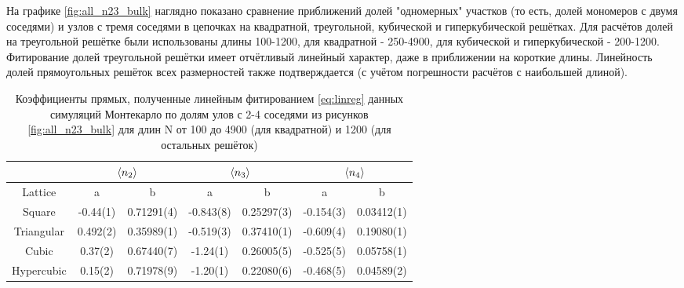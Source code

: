 На графике \ref{fig:all_n23_bulk} наглядно показано сравнение приближений долей "одномерных" участков (то есть, долей мономеров с двумя соседями) и узлов с тремя соседями в цепочках на квадратной, треугольной, кубической и гиперкубической решётках. Для расчётов долей на треугольной решётке были использованы длины 100-1200, для квадратной - 250-4900, для кубической и гиперкубической - 200-1200. Фитирование долей треугольной решётки имеет отчётливый линейный характер, даже в приближении на короткие длины. Линейность долей прямоугольных решёток всех размерностей также подтверждается (с учётом погрешности расчётов с наибольшей длиной). 

\begin{table}[h]
    \centering
    \begin{tabular}{|c|c|c|c|c|c|c|} \hline
         & \multicolumn{2}{|c|}{$\langle n_{2} \rangle$} & \multicolumn{2}{|c|}{$\langle n_{3} \rangle$} & \multicolumn{2}{|c|}{$\langle n_{4} \rangle$}\\ \hline
         Lattice & a & b & a & b  & a & b  \\ \hline
        Square & -0.44(1) & 0.71291(4) & -0.843(8) & 0.25297(3) &  -0.154(3) & 0.03412(1)  \\ \hline
        Triangular & 0.492(2) & 0.35989(1) & -0.519(3) & 0.37410(1) & -0.609(4) & 0.19080(1)  \\ \hline
        Cubic & 0.37(2) & 0.67440(7) &  -1.24(1) & 0.26005(5) & -0.525(5) & 0.05758(1) \\ \hline
        Hypercubic & 0.15(2) & 0.71978(9) & -1.20(1) & 0.22080(6) & -0.468(5) & 0.04589(2)\\ \hline
    \end{tabular}
    \caption{Коэффициенты прямых, полученные линейным фитированием \eqref{eq:linreg} данных симуляций Монтекарло по долям улов с 2-4 соседями из рисунков \ref{fig:all_n23_bulk} для длин N от 100 до 4900 (для квадратной) и 1200 (для остальных решёток)}
    \label{tab:n24_fit_coeff_100}
\end{table}

